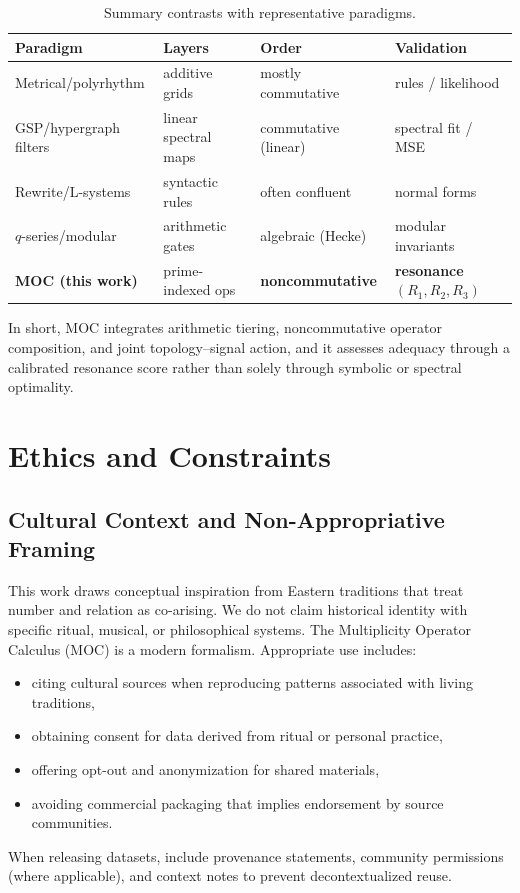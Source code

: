 \documentclass[12pt]{article}
\numberwithin{equation}{section}
\theoremstyle{plain}
\theoremstyle{definition}
\theoremstyle{remark}
\begin{document}
\begin{table}[h]
\centering
\caption{Summary contrasts with representative paradigms.}
\begin{tabular}{llll}
\hline
Paradigm & Layers & Order & Validation \\
\hline
Metrical/polyrhythm & additive grids & mostly commutative & rules / likelihood \\
GSP/hypergraph filters & linear spectral maps & commutative (linear) & spectral fit / MSE \\
Rewrite/L-systems & syntactic rules & often confluent & normal forms \\
$q$-series/modular & arithmetic gates & algebraic (Hecke) & modular invariants \\
\textbf{MOC (this work)} & prime-indexed ops & \textbf{noncommutative} & \textbf{resonance }$(R_1,R_2,R_3)$ \\
\hline
\end{tabular}
\end{table}

\noindent In short, MOC integrates arithmetic tiering, noncommutative operator composition, and joint topology–signal action, and it assesses adequacy through a calibrated resonance score rather than solely through symbolic or spectral optimality.

\section*{Ethics and Constraints}

\subsection*{Cultural Context and Non-Appropriative Framing}
This work draws conceptual inspiration from Eastern traditions that treat number and relation as co-arising. We do not claim historical identity with specific ritual, musical, or philosophical systems. The Multiplicity Operator Calculus (MOC) is a modern formalism. Appropriate use includes:
\begin{itemize}
  \item citing cultural sources when reproducing patterns associated with living traditions,
  \item obtaining consent for data derived from ritual or personal practice,
  \item offering opt-out and anonymization for shared materials,
  \item avoiding commercial packaging that implies endorsement by source communities.
\end{itemize}
When releasing datasets, include provenance statements, community permissions (where applicable), and context notes to prevent decontextualized reuse.
\end{document}
